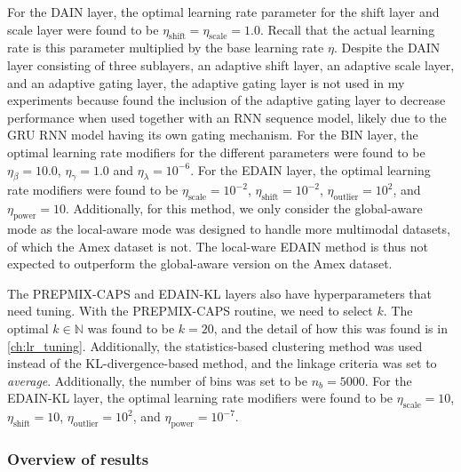 \documentclass{statsmsc}
\begin{document}
{%
For the DAIN layer, the optimal learning rate parameter for the shift layer
and scale layer were found to be $\eta_{\textrm{shift}}=\eta_{\textrm{scale}}=1.0$. Recall that
the actual learning rate is this parameter multiplied by the base learning rate $\eta$.
Despite the \ac{DAIN} layer consisting of three sublayers, an adaptive shift layer, an adaptive
scale layer, and an adaptive gating layer, the adaptive gating layer is not used in my
experiments because \cite{dain} found the inclusion of the adaptive gating layer to decrease
performance when used together with an \ac{RNN} sequence model, likely due to the \ac{GRU}
\ac{RNN} model having its own gating mechanism.
For the \ac{BIN} layer, the optimal learning rate modifiers for the different parameters were
found to be $\eta_\beta=10.0$, $\eta_\gamma=1.0$ and $\eta_\lambda=10^{-6}$.
For the \ac{EDAIN} layer, the optimal learning rate modifiers were found to be
$\eta_{\textrm{scale}}=10^{-2}$, $\eta_{\textrm{shift}}=10^{-2}$, $\eta_{\textrm{outlier}}=10^{2}$,
and $\eta_{\textrm{power}}=10$. Additionally, for this method, we only consider the global-aware
mode as the local-aware mode was designed to handle more multimodal datasets, of which the Amex
dataset is not. The local-ware \ac{EDAIN} method is thus not expected to outperform the global-aware
version on the Amex dataset.

The \ac{PREPMIX-CAPS} and \ac{EDAIN-KL} layers also have hyperparameters that need
tuning. With the \ac{PREPMIX-CAPS} routine, we need to select $k$. The optimal $k \in \mathbb{N}$
was found to be $k=20$, and the detail of how this was found is in \cref{ch:lr_tuning}.
Additionally, the statistics-based clustering method was used instead of the \ac{KL-divergence}-based
method, and the linkage criteria was set to \textit{average}. Additionally, the number of bins
was set to be $n_{b}=5000$. For the \ac{EDAIN-KL} layer, the optimal learning
rate modifiers were found to be
$\eta_{\textrm{scale}}=10$, $\eta_{\textrm{shift}}=10$, $\eta_{\textrm{outlier}}=10^{2}$,
and $\eta_{\textrm{power}}=10^{-7}$.


\subsubsection{Overview of results}%
\label{ssub:amex-results}

}
\end{document}
